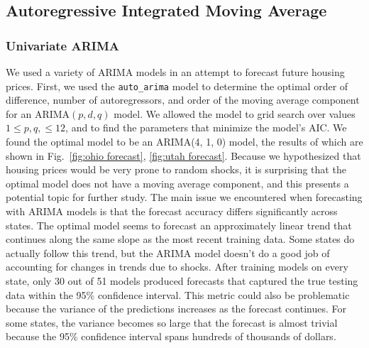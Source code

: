 \documentclass[11pt]{amsart}
\begin{document}
\subsection{Autoregressive Integrated Moving Average}
\subsubsection{Univariate ARIMA}

We used a variety of ARIMA models in an attempt to forecast future housing prices.
First, we used the \texttt{auto\_arima} model to determine the optimal order of difference, number of autoregressors, and order of the moving average component for an ARIMA$(p, d, q)$ model.
We allowed the model to grid search over values $1 \leq p, q, \leq 12$, and to find the parameters that minimize the model's AIC. We found the optimal model to be an ARIMA(4, 1, 0) model, the results of which are shown in Fig.~\ref{fig:ohio forecast}, \ref{fig:utah forecast}. 
Because we hypothesized that housing prices would be very prone to random shocks, it is surprising that the optimal model does not have a moving average component, and this presents a potential topic for further study.
The main issue we encountered when forecasting with ARIMA models is that the forecast accuracy differs significantly across states.
The optimal model seems to forecast an approximately linear trend that continues along the same slope as the most recent training data.
Some states do actually follow this trend, but the ARIMA model doesn't do a good job of accounting for changes in trends due to shocks.
After training models on every state, only 30 out of 51 models produced forecasts that captured the true testing data within the 95\% confidence interval.
This metric could also be problematic because the variance of the predictions increases as the forecast continues.
For some states, the variance becomes so large that the forecast is almost trivial because the 95\% confidence interval spans hundreds of thousands of dollars. %
\end{document}
